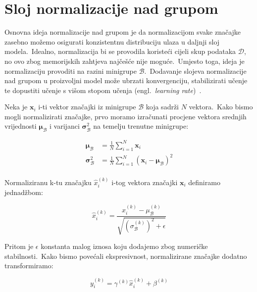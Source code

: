 \documentclass[diplomskirad]{fer}
\begin{document}
\section{Sloj normalizacije nad grupom}
\label{sek:batch_norm}

Osnovna ideja normalizacije nad grupom je da normalizacijom svake značajke zasebno možemo osigurati konzistentnu distribuciju ulaza u daljnji sloj modela.\ 
Idealno, normalizacija bi se provodila koristeći cijeli skup podataka $\mathcal{D}$, no ovo zbog memorijskih zahtjeva najčešće nije moguće.\ Umjesto toga, ideja je normalizaciju provoditi na razini minigrupe $\mathcal{B}$.\ 
Dodavanje slojeva normalizacije nad grupom u proizvoljni model može ubrzati konvergenciju, stabilizirati učenje te dopustiti učenje s višom stopom učenja (engl.\ \textit{learning rate})~\cite{ioffe2015batch}.\ 

\pagebreak

Neka je $\bm{x}_i$ i-ti vektor značajki iz minigrupe $\mathcal{B}$ koja sadrži $N$ vektora.\ Kako bismo mogli normalizirati značajke, prvo moramo izračunati procjene vektora srednjih vrijednosti $\bm{\mu}_{\mathcal{B}}$ i varijanci $\bm{\sigma}_{\mathcal{B}}^2$ na temelju trenutne minigrupe:

\begin{equation}
  \begin{aligned}
    \bm{\mu}_{\mathcal{B}} &= \frac{1}{N} \sum_{i=1}^{N} \bm{x}_i \\
    \bm{\sigma}_{\mathcal{B}}^2 &= \frac{1}{N} \sum_{i=1}^{N} (\bm{x}_i - \bm{\mu}_{\mathcal{B}})^2 \\
  \end{aligned}
  \label{eq:batch_norm_stats}
\end{equation}

Normaliziranu k-tu značajku $\hat{x}_i^{(k)}$ i-tog vektora značajki $\bm{x}_i$ definiramo jednadžbom:

\begin{equation}
  \hat{x}_i^{(k)} = \frac{x_i^{(k)} - \mu_{\mathcal{B}}^{(k)}}{\sqrt{(\sigma_{\mathcal{B}}^{(k)})^2 + \epsilon}}
  \label{eq:batch_norm}
\end{equation}

Pritom je $\epsilon$ konstanta malog iznosa koju dodajemo zbog numeričke stabilnosti.\ Kako bismo povećali ekspresivnost, normalizirane značajke dodatno transformiramo:

\begin{equation}
  y_i^{(k)} = \gamma^{(k)} \hat{x}_i^{(k)} + \beta^{(k)}
  \label{eq:batch_norm_scaling}
\end{equation}
\end{document}
